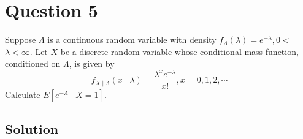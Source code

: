 \section*{Question 5}
\setcounter{section}{5}
\setcounter{equation}{0}

Suppose \( \Lambda \) is a continuous random variable with density \( f_{\Lambda}(\lambda)=e^{-\lambda}, 0< \) \( \lambda<\infty \).
Let \( X \) be a discrete random variable whose conditional mass function, conditioned on \( \Lambda \), is given by
\[
    f_{X \mid \Lambda}(x \mid \lambda)=\frac{\lambda^{x} e^{-\lambda}}{x!}, x=0,1,2, \cdots
\]
Calculate \( E\left[e^{-\Lambda} \mid X=1\right] \).

\subsection*{Solution}

